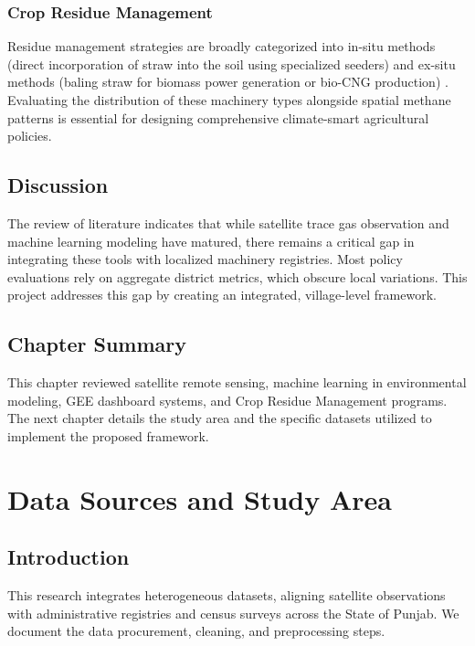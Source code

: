 \documentclass[12pt,a4paper]{report}
\begin{document}
\subsection{Crop Residue Management}
Residue management strategies are broadly categorized into in-situ methods (direct incorporation of straw into the soil using specialized seeders) and ex-situ methods (baling straw for biomass power generation or bio-CNG production) \citep{ravishankara2020air}. Evaluating the distribution of these machinery types alongside spatial methane patterns is essential for designing comprehensive climate-smart agricultural policies.

\section{Discussion}
The review of literature indicates that while satellite trace gas observation and machine learning modeling have matured, there remains a critical gap in integrating these tools with localized machinery registries. Most policy evaluations rely on aggregate district metrics, which obscure local variations. This project addresses this gap by creating an integrated, village-level framework.

\section{Chapter Summary}
This chapter reviewed satellite remote sensing, machine learning in environmental modeling, GEE dashboard systems, and Crop Residue Management programs. The next chapter details the study area and the specific datasets utilized to implement the proposed framework.

\chapter{Data Sources and Study Area}
\label{ch:data_sources}

\section{Introduction}
This research integrates heterogeneous datasets, aligning satellite observations with administrative registries and census surveys across the State of Punjab. We document the data procurement, cleaning, and preprocessing steps.
\end{document}
